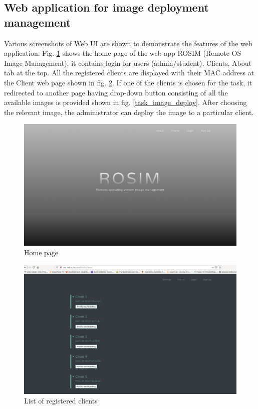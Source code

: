\documentclass[a4paper,12pt]{article}
\begin{document}
\subsection{ Web application for image deployment management }
Various screenshots of Web UI are shown to demonstrate the features of the web application. Fig. \ref{home_page} shows the home page of the web app ROSIM (Remote OS Image Management), it contains login for users (admin/student), Clients, About tab at the top. All the registered clients are displayed with their MAC address at the Client web page shown in fig. \ref{reg_clients}. If one of the clients is chosen for the task, it redirected to another page having drop-down button consisting of all the available images is provided shown in fig. \ref{task_image_deploy}. After choosing the relevant image, the administrator can deploy the image to a particular client.
\begin{figure}
    \centering
    \includegraphics[width=\linewidth]{webapp1.png}
    \caption{Home page}
    \label{home_page}
\end{figure}
\begin{figure}
    \centering
    \includegraphics[width=\linewidth]{clientslist.png}
    \caption{List of registered clients}
    \label{reg_clients}
\end{figure}
\end{document}
